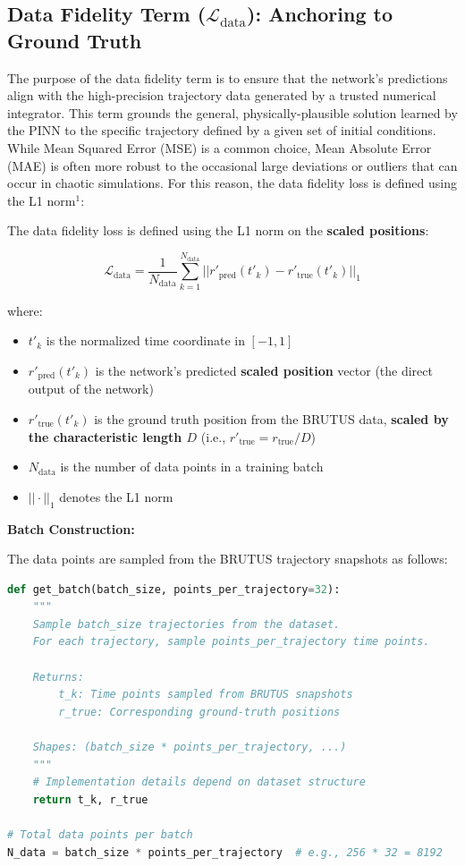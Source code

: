 \documentclass{article}
\begin{document}
\subsection[Data Fidelity Term: Anchoring to Ground Truth]{Data Fidelity Term ($\mathcal{L}_{\text{data}}$): Anchoring to Ground Truth}

The purpose of the data fidelity term is to ensure that the network's predictions align with the high-precision trajectory data generated by a trusted numerical integrator. This term grounds the general, physically-plausible solution learned by the PINN to the specific trajectory defined by a given set of initial conditions. While Mean Squared Error (MSE) is a common choice, Mean Absolute Error (MAE) is often more robust to the occasional large deviations or outliers that can occur in chaotic simulations. For this reason, the data fidelity loss is defined using the L1 norm$^1$:



The data fidelity loss is defined using the L1 norm on the \textbf{scaled positions}:

\[
\mathcal{L}_{\text{data}} = \frac{1}{N_{\text{data}}} \sum_{k=1}^{N_{\text{data}}} ||r'_{\text{pred}}(t'_k) - r'_{\text{true}}(t'_k)||_1
\]

where:
\begin{itemize}
    \item $t'_k$ is the normalized time coordinate in $[-1, 1]$
    \item $r'_{\text{pred}}(t'_k)$ is the network's predicted \textbf{scaled position} vector (the direct output of the network)
    \item $r'_{\text{true}}(t'_k)$ is the ground truth position from the BRUTUS data, \textbf{scaled by the characteristic length $D$} (i.e., $r'_{\text{true}} = r_{\text{true}}/D$)
    \item $N_{\text{data}}$ is the number of data points in a training batch
    \item $|| \cdot ||_1$ denotes the L1 norm
\end{itemize}






\textbf{Batch Construction:}

The data points are sampled from the BRUTUS trajectory snapshots as follows:

\begin{lstlisting}[language=Python, caption={Data Batch Construction}]
def get_batch(batch_size, points_per_trajectory=32):
    """
    Sample batch_size trajectories from the dataset.
    For each trajectory, sample points_per_trajectory time points.
    
    Returns:
        t_k: Time points sampled from BRUTUS snapshots
        r_true: Corresponding ground-truth positions
        
    Shapes: (batch_size * points_per_trajectory, ...)
    """
    # Implementation details depend on dataset structure
    return t_k, r_true

# Total data points per batch
N_data = batch_size * points_per_trajectory  # e.g., 256 * 32 = 8192
\end{lstlisting}
\end{document}
